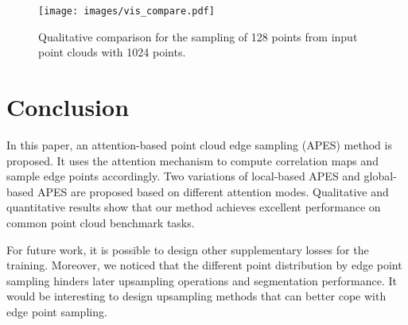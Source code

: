\documentclass[10pt,twocolumn,letterpaper]{article}
\begin{document}
\begin{figure}[t]
    \centering
    \setlength{\abovecaptionskip}{0.2cm}
    \texttt{[image: images/vis\_compare.pdf]}
    \caption{Qualitative comparison for the sampling of 128 points from input point clouds with 1024 points. 
    \vspace{-0.2cm}
    }
    \label{fig:vis_compare}
\end{figure}


\section{Conclusion}
\label{sec:conclusion}
In this paper, an attention-based point cloud edge sampling (APES) method is proposed. 
It uses the attention mechanism to compute correlation maps and sample edge points accordingly. Two variations of local-based APES and global-based APES are proposed based on different attention modes. Qualitative and quantitative results show that our method achieves excellent performance on common point cloud benchmark tasks.

For future work, it is possible to design other supplementary losses for the training. Moreover, we noticed that the different point distribution by edge point sampling hinders later upsampling operations and segmentation performance. It would be interesting to design upsampling methods that can better cope with edge point sampling.

{\small


}
\end{document}
